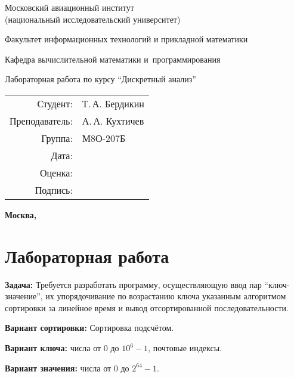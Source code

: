 \documentclass{article}
\newcommand{\CWHeader}[1]{\section*{#1}}
\newcommand{\CWProblem}[1]{\par\textbf{Задача: }#1}
\begin{document}
\begin{titlepage}
\begin{center}
\bfseries

{\Large Московский авиационный институт\\ (национальный исследовательский университет)

}

\vspace{48pt}

{\large Факультет информационных технологий и прикладной математики
}

\vspace{36pt}

{\large Кафедра вычислительной математики и~программирования

}


\vspace{48pt}

Лабораторная работа  по курсу \enquote{Дискретный анализ}

\end{center}

\vspace{72pt}

\begin{flushright}
\begin{tabular}{rl}
Студент: & Т.\,А. Бердикин \\
Преподаватель: & А.\,А. Кухтичев \\
Группа: & М8О-207Б \\
Дата: & \\
Оценка: & \\
Подпись: & \\
\end{tabular}
\end{flushright}

\vfill

\begin{center}
\bfseries
Москва, \the\year
\pagebreak
\end{center}
\end{titlepage}
\CWHeader{Лабораторная работа }

\CWProblem{
Требуется разработать программу, осуществляющую ввод пар \enquote{ключ-значение}, их 
упорядочивание по возрастанию ключа указанным алгоритмом сортировки за линейное время и вывод отсортированной последовательности.

{\bfseries Вариант сортировки:} Сортировка подсчётом.

{\bfseries Вариант ключа:} { \normalfont\ttfamily числа от 0 до $10^{6}-1$, почтовые индексы. }

{\bfseries Вариант значения:} { \normalfont\ttfamily числа от 0 до $2^{64}-1$.}
}
\pagebreak
\end{document}
